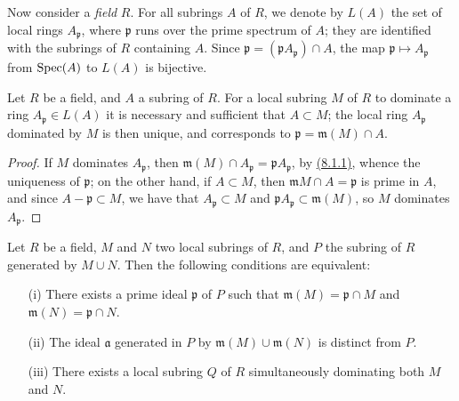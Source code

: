\begin{env}[8.1.2]
\label{env-1.8.1.2}
Now consider a {\it field} $R$. For all subrings $A$ of
$R$, we denote by $L(A)$ the set of local rings $A_\mathfrak{p}$, where
$\mathfrak{p}$ runs over the prime spectrum of $A$; they are identified with the
subrings of $R$ containing $A$. Since
$\mathfrak{p}=(\mathfrak{p}A_\mathfrak{p})\cap A$, the map
$\mathfrak{p}\mapsto A_\mathfrak{p}$ from ${\mathop{\mathrm{Spec}}\nolimits}(A)$ to $L(A)$ is bijective.
\end{env}

\begin{lem}[8.1.3]
\label{lem-1.8.1.3}
Let $R$ be a field, and $A$ a subring of $R$. For a
local subring $M$ of $R$ to dominate a ring $A_\mathfrak{p}\in L(A)$ it is
necessary and sufficient that $A\subset M$; the local ring $A_\mathfrak{p}$
dominated by $M$ is then unique, and corresponds to
$\mathfrak{p}=\mathfrak{m}(M)\cap A$.
\end{lem}

\begin{proof}
\label{proof-lem-1.8.1.3}
If $M$ dominates $A_\mathfrak{p}$, then
$\mathfrak{m}(M)\cap A_\mathfrak{p}=\mathfrak{p}A_\mathfrak{p}$,
by \hyperref[lem-1.8.1.1]{(8.1.1)}, whence the uniqueness of $\mathfrak{p}$; on the other hand,
if $A\subset M$, then $\mathfrak{m}M\cap A=\mathfrak{p}$ is prime in $A$, and since
$A-\mathfrak{p}\subset M$, we have that $A_\mathfrak{p}\subset M$ and
$\mathfrak{p}A_\mathfrak{p}\subset\mathfrak{m}(M)$, so $M$ dominates
$A_\mathfrak{p}$.
\end{proof}

\begin{lem}[8.1.4]
\label{lem-1.8.1.4}
Let $R$ be a field, $M$ and $N$ two local
subrings of $R$, and $P$ the subring of $R$ generated by $M\cup N$. Then the
following conditions are equivalent:
\begin{itemize}
  \item[{\rm(i)}] There exists a prime ideal $\mathfrak{p}$ of $P$ such that
        $\mathfrak{m}(M)=\mathfrak{p}\cap M$ and $\mathfrak{m}(N)=\mathfrak{p}\cap N$.
  \item[{\rm(ii)}] The ideal $\mathfrak{a}$ generated in $P$ by $\mathfrak{m}(M)\cup\mathfrak{m}(N)$ is
        distinct from $P$.
  \item[{\rm(iii)}] There exists a local subring $Q$ of $R$ simultaneously dominating both $M$ and $N$.
\end{itemize}
\end{lem}

